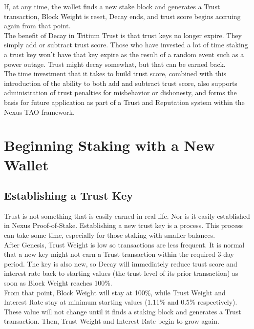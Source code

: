 \documentclass[11pt]{article}
\begin{document}
\noindent If, at any time, the wallet finds a new stake block and generates a Trust transaction, Block Weight is reset, Decay ends, and trust score begins accruing again from that point. \\

\noindent The benefit of Decay in Tritium Trust is that trust keys no longer expire. They simply add or subtract trust score. Those who have invested a lot of time staking a trust key won’t have that key expire as the result of a random event such as a power outage. Trust might decay somewhat, but that can be earned back.\\

\noindent The time investment that it takes to build trust score, combined with this introduction of the ability to both add and subtract trust score, also supports administration of trust penalties for misbehavior or dishonesty, and forms the basis for future application as part of a Trust and Reputation system within the Nexus TAO framework.\\

\bigskip

\section{Beginning Staking with a New Wallet}

\subsection{Establishing a Trust Key}
Trust is not something that is easily earned in real life. Nor is it easily established in Nexus Proof-of-Stake. Establishing a new trust key is a process. This process can take some time, especially for those staking with smaller balances.\\

\noindent After Genesis, Trust Weight is low so transactions are less frequent. It is normal that a new key might not earn a Trust transaction within the required 3-day period. The key is also new, so Decay will immediately reduce trust score and interest rate back to starting values (the trust level of its prior transaction) as soon as Block Weight reaches 100\%.\\ 

\noindent From that point, Block Weight will stay at 100\%, while Trust Weight and Interest Rate stay at minimum starting values (1.11\% and 0.5\% respectively). These value will not change until it finds a staking block and generates a Trust transaction. Then, Trust Weight and Interest Rate begin to grow again.\\
\end{document}
